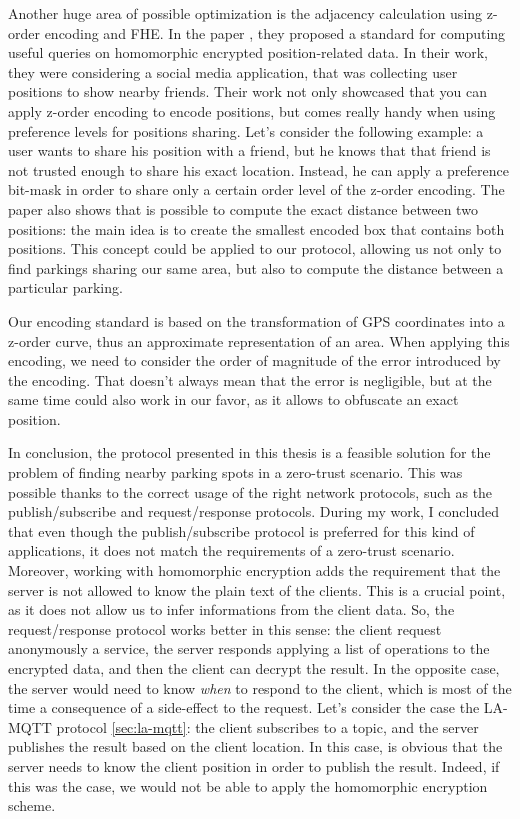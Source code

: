 Another huge area of possible optimization is the adjacency calculation using z-order encoding and FHE. In the paper \cite{zhang2020privacy}, they proposed a standard for computing useful queries on homomorphic encrypted position-related data. In their work, they were considering a social media application, that was collecting user positions to show nearby friends. Their work not only showcased that you can apply z-order encoding to encode positions, but comes really handy when using preference levels for positions sharing. Let's consider the following example: a user wants to share his position with a friend, but he knows that that friend is not trusted enough to share his exact location. Instead, he can apply a preference bit-mask in order to share only a certain order level of the z-order encoding. The paper also shows that is possible to compute the exact distance between two positions: the main idea is to create the smallest encoded box that contains both positions. This concept could be applied to our protocol, allowing us not only to find parkings sharing our same area, but also to compute the distance between a particular parking.


Our encoding standard is based on the transformation of GPS coordinates into a z-order curve, thus an approximate representation of an area. When applying this encoding, we need to consider the order of magnitude of the error introduced by the encoding. That doesn't always mean that the error is negligible, but at the same time could also work in our favor, as it allows to obfuscate an exact position.

In conclusion, the protocol presented in this thesis is a feasible solution for the problem of finding nearby parking spots in a zero-trust scenario. This was possible thanks to the correct usage of the right network protocols, such as the publish/subscribe and request/response protocols. During my work, I concluded that even though the publish/subscribe protocol is preferred for this kind of applications, it does not match the requirements of a zero-trust scenario. Moreover, working with homomorphic encryption adds the requirement that the server is not allowed to know the plain text of the clients. This is a crucial point, as it does not allow us to infer informations from the client data. So, the request/response protocol works better in this sense: the client request anonymously a service, the server responds applying a list of operations to the encrypted data, and then the client can decrypt the result. In the opposite case, the server would need to know \emph{when} to respond to the client, which is most of the time a consequence of a side-effect to the request. Let's consider the case the LA-MQTT protocol \ref{sec:la-mqtt}: the client subscribes to a topic, and the server publishes the result based on the client location. In this case, is obvious that the server needs to know the client position in order to publish the result. Indeed, if this was the case, we would not be able to apply the homomorphic encryption scheme.
